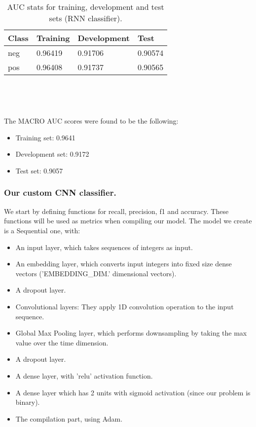 \documentclass[10pt, a4paper]{article}
\begin{document}
	\begin{table}
		\begin{tabular}{|l|l|l|l|}
			\hline
			\cellcolor{blue!25}\textbf{Class} & \cellcolor{blue!25}\textbf{Training} & \cellcolor{blue!25}\textbf{Development} & \cellcolor{blue!25}\textbf{Test}\\
			\hline
			neg & 0.96419 & 0.91706 & 0.90574 \\\hline
			pos & 0.96408 & 0.91737 & 0.90565 \\\hline
			
		\end{tabular}
		\centering
		\caption{AUC stats for training, development and test sets (RNN classifier).}
		\label{tab::ex-1-stats-auc}
	\end{table}
	\ 
	
	
	
	\
	
	The MACRO AUC scores were found to be the following:
	\begin{itemize}
		\item Training set: 0.9641
		\item Development set: 0.9172
		\item Test set: 0.9057
	\end{itemize}

    \subsubsection{Our custom CNN classifier.}
    We start by defining functions for recall, precision, f1 and accuracy. These functions will be used as metrics when compiling our model. The model we create is a Sequential one, with:
    \begin{itemize}
            \item An input layer, which takes sequences of integers as input.
		\item An embedding layer, which converts input integers into fixed size dense vectors ('EMBEDDING\_DIM.' dimensional vectors).
		\item A dropout layer.
		\item Convolutional layers: They apply 1D convolution operation to the input sequence.
		\item Global Max Pooling layer, which performs downsampling by taking the max value over the time dimension.
            \item A dropout layer.
		\item A dense layer, with 'relu' activation function.
            \item A dense layer which has 2 units with sigmoid activation (since our problem is binary).
            \item The compilation part, using Adam.
	\end{itemize}
\end{document}
